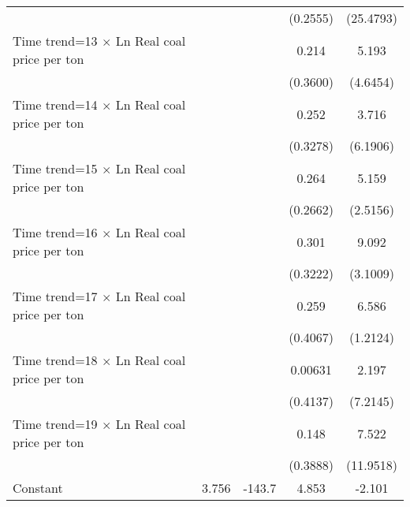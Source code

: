 {\begin{tabular}{l*{4}{c}}
                    &                     &                     &    (0.2555)         &   (25.4793)         \\
\addlinespace
Time trend=13 $\times$ Ln Real coal price per ton&                     &                     &       0.214         &       5.193         \\
                    &                     &                     &    (0.3600)         &    (4.6454)         \\
\addlinespace
Time trend=14 $\times$ Ln Real coal price per ton&                     &                     &       0.252         &       3.716         \\
                    &                     &                     &    (0.3278)         &    (6.1906)         \\
\addlinespace
Time trend=15 $\times$ Ln Real coal price per ton&                     &                     &       0.264         &       5.159\sym{**} \\
                    &                     &                     &    (0.2662)         &    (2.5156)         \\
\addlinespace
Time trend=16 $\times$ Ln Real coal price per ton&                     &                     &       0.301         &       9.092\sym{***}\\
                    &                     &                     &    (0.3222)         &    (3.1009)         \\
\addlinespace
Time trend=17 $\times$ Ln Real coal price per ton&                     &                     &       0.259         &       6.586\sym{***}\\
                    &                     &                     &    (0.4067)         &    (1.2124)         \\
\addlinespace
Time trend=18 $\times$ Ln Real coal price per ton&                     &                     &     0.00631         &       2.197         \\
                    &                     &                     &    (0.4137)         &    (7.2145)         \\
\addlinespace
Time trend=19 $\times$ Ln Real coal price per ton&                     &                     &       0.148         &       7.522         \\
                    &                     &                     &    (0.3888)         &   (11.9518)         \\
\addlinespace
Constant            &       3.756         &      -143.7         &       4.853         &      -2.101         \\

\end{tabular}}
